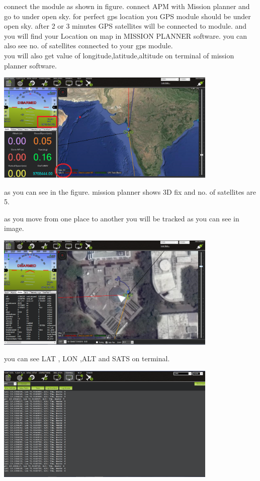 \documentclass[11pt,a4paper]{article}
\begin{document}
		\vspace{1in}
		connect the module as shown in figure. connect APM with Mission planner and go to under open sky.
		for perfect gps location you GPS module should be under open sky. after 2 or 3 minutes GPS satellites will be connected to module. and you will find your Location on map in MISSION PLANNER software. you can also see no. of satellites connected to your gps module. \\
		
		you will also get value of longitude,latitude,altitude on terminal of mission planner software.\newline
		
		\begin{center}
		\includegraphics[width = 400px]{map1}
		\end{center}
		\hspace{0.5in}
		as you can see in the figure. mission planner shows 3D fix and no. of satellites are 5.
		
		\newpage
		\hspace{0.5in}
		as you move from one place to another you will be tracked as you can see in image.
			\begin{center}
				\includegraphics[width = 400px]{map2}
			\end{center}
	you can see  LAT , LON ,ALT and SATS on terminal.
		\begin{center}
			\includegraphics[width = 400px]{map3}
		\end{center}
\end{document}
